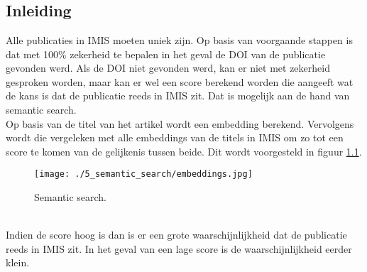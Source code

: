 
\chapter{}%
\label{ch:semantic_search}

\section{Inleiding}
Alle publicaties in IMIS moeten uniek zijn. Op basis van voorgaande stappen is dat met 100\% zekerheid te bepalen in het geval de DOI van de publicatie gevonden werd.
Als de DOI niet gevonden werd, kan er niet met zekerheid gesproken worden, maar kan er wel een score berekend worden die aangeeft wat de kans is dat de publicatie reeds in IMIS zit. Dat is mogelijk aan de hand van semantic search.\\
Op basis van de titel van het artikel wordt een embedding berekend. Vervolgens wordt die vergeleken met alle embeddings van de titels in IMIS om zo tot een score te komen van de gelijkenis tussen beide. Dit wordt voorgesteld in figuur \ref{fig:Semanticsearch}.
\begin{figure}
    \centering
    \texttt{[image: ./5\_semantic\_search/embeddings.jpg]}
    \caption[Semantic search.]{\label{fig:Semanticsearch}Semantic search.}
\end{figure}
\\
Indien de score hoog is dan is er een grote waarschijnlijkheid dat de publicatie reeds in IMIS zit. In het geval van een lage score is de waarschijnlijkheid eerder klein.\\
